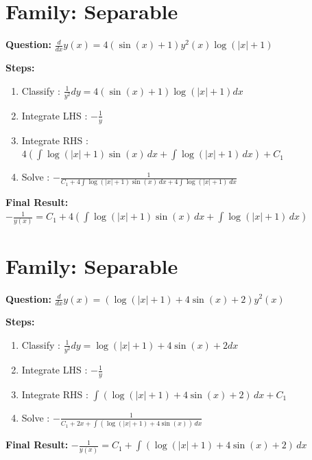 \documentclass{article}
\begin{document}
\section*{Family: Separable}
\textbf{Question:} $\frac{d}{d x} y{\left(x \right)} = 4 \left(\sin{\left(x \right)} + 1\right) y^{2}{\left(x \right)} \log{\left(\left|{x}\right| + 1 \right)}$

\textbf{Steps:}
\begin{enumerate}
\item Classify :  $\frac{1}{y^{2}} dy = 4 \left(\sin{\left(x \right)} + 1\right) \log{\left(\left|{x}\right| + 1 \right)} dx$
\item Integrate LHS :  $- \frac{1}{y}$
\item Integrate RHS :  $4 \left(\int \log{\left(\left|{x}\right| + 1 \right)} \sin{\left(x \right)}\, dx + \int \log{\left(\left|{x}\right| + 1 \right)}\, dx\right) + C_1$
\item Solve :  $- \frac{1}{C_{1} + 4 \int \log{\left(\left|{x}\right| + 1 \right)} \sin{\left(x \right)}\, dx + 4 \int \log{\left(\left|{x}\right| + 1 \right)}\, dx}$
\end{enumerate}
\textbf{Final Result:} $- \frac{1}{y{\left(x \right)}} = C_{1} + 4 \left(\int \log{\left(\left|{x}\right| + 1 \right)} \sin{\left(x \right)}\, dx + \int \log{\left(\left|{x}\right| + 1 \right)}\, dx\right)$

\section*{Family: Separable}
\textbf{Question:} $\frac{d}{d x} y{\left(x \right)} = \left(\log{\left(\left|{x}\right| + 1 \right)} + 4 \sin{\left(x \right)} + 2\right) y^{2}{\left(x \right)}$

\textbf{Steps:}
\begin{enumerate}
\item Classify :  $\frac{1}{y^{2}} dy = \log{\left(\left|{x}\right| + 1 \right)} + 4 \sin{\left(x \right)} + 2 dx$
\item Integrate LHS :  $- \frac{1}{y}$
\item Integrate RHS :  $\int \left(\log{\left(\left|{x}\right| + 1 \right)} + 4 \sin{\left(x \right)} + 2\right)\, dx + C_1$
\item Solve :  $- \frac{1}{C_{1} + 2 x + \int \left(\log{\left(\left|{x}\right| + 1 \right)} + 4 \sin{\left(x \right)}\right)\, dx}$
\end{enumerate}
\textbf{Final Result:} $- \frac{1}{y{\left(x \right)}} = C_{1} + \int \left(\log{\left(\left|{x}\right| + 1 \right)} + 4 \sin{\left(x \right)} + 2\right)\, dx$
\end{document}
